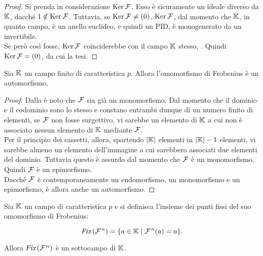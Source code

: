 \begin{proof}
    Si prenda in considerazione $\operatorname{Ker} \mathcal{F}$. Esso è sicuramente
    un ideale diverso da $\mathbb{K}$, dacché $1 \notin \operatorname{Ker} \mathcal{F}$.
    Tuttavia, se $\operatorname{Ker} \mathcal{F} \neq (0)$, $\operatorname{Ker} \mathcal{F}$, dal
    momento che $\mathbb{K}$, in quanto campo, è un anello euclideo,
    e quindi un PID, è monogenerato da un invertibile. \\

    Se però così fosse, $\operatorname{Ker} \mathcal{F}$ coinciderebbe con il
    campo $\mathbb{K}$ stesso, \Lightning{}. Quindi $\operatorname{Ker} \mathcal{F} = (0)$,
    da cui la tesi.
\end{proof}

\begin{proposition}
    Sia $\mathbb{K}$ un campo finito di caratteristica $p$. Allora
    l'omomorfismo di Frobenius è un automorfismo.
\end{proposition}

\begin{proof}
    Dalla  è noto che
    $\mathcal{F}$ sia già un monomorfismo. Dal momento che
    il dominio e il codominio sono lo stesso e constano
    entrambi dunque di un numero finito di elementi,
    se $\mathcal{F}$ non fosse surgettivo, vi sarebbe un elemento
    di $\mathbb{K}$ a cui non è associato nessun elemento di $\mathbb{K}$
    mediante $\mathcal{F}$. \\

    Per il principio dei cassetti, allora, spartendo
    $\left|\mathbb{K}\right|$ elementi in $\left|\mathbb{K}\right|-1$ elementi,
    vi sarebbe almeno un elemento dell'immagine a cui
    sarebbero associati due elementi del dominio. Tuttavia
    questo è assurdo dal momento che $\mathcal{F}$ è un
    monomorfismo. Quindi $\mathcal{F}$ è un epimorfismo. \\

    Dacché $\mathcal{F}$ è contemporaneamente un endomorfismo,
    un monomorfismo e un epimorfismo, è allora anche
    un automorfismo.
\end{proof}

\begin{proposition}
    \label{prop:punti_fissi_frobenius_campo}
    Sia $\mathbb{K}$ un campo di caratteristica $p$ e si
    definisca l'insieme dei punti fissi del suo
    omomorfismo di Frobenius:

    \[ \operatorname{\textit{Fix}\,}(\mathcal{F}{\mkern 1.5mu}^n) = \{ a \in \mathbb{K} \mid \mathcal{F}{\mkern 1.5mu}^n(a) = a \} .\]

    \vskip 0.1in

    Allora $\operatorname{\textit{Fix}\,}(\mathcal{F}{\mkern 1.5mu}^n)$ è un sottocampo di $\mathbb{K}$.
\end{proposition}

